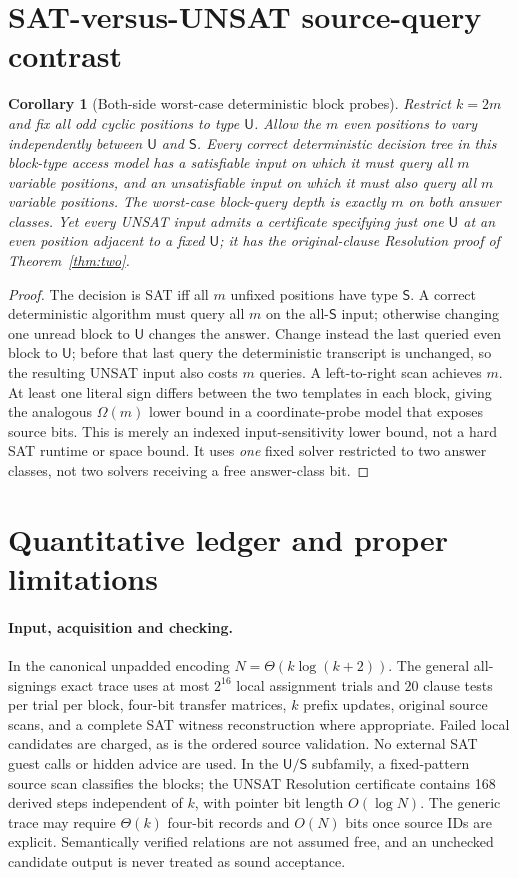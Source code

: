 \documentclass[11pt]{article}
\newtheorem{corollary}[theorem]{Corollary}
\newcommand{\U}{\mathsf{U}}
\newcommand{\V}{\mathsf{S}}
\begin{document}
\section{SAT-versus-UNSAT source-query contrast}
\begin{corollary}[Both-side worst-case deterministic block probes]\label{cor:query}
Restrict $k=2m$ and fix all odd cyclic positions to type $\U$. Allow the $m$ even positions to vary independently between $\U$ and $\V$. Every correct deterministic decision tree in this block-type access model has a satisfiable input on which it must query all $m$ variable positions, and an unsatisfiable input on which it must also query all $m$ variable positions. The worst-case block-query depth is exactly $m$ on both answer classes. Yet every UNSAT input admits a certificate specifying just one $\U$ at an even position adjacent to a fixed $\U$; it has the original-clause Resolution proof of Theorem~\ref{thm:two}.
\end{corollary}
\begin{proof}
The decision is SAT iff all $m$ unfixed positions have type $\V$. A correct deterministic algorithm must query all $m$ on the all-$\V$ input; otherwise changing one unread block to $\U$ changes the answer. Change instead the last queried even block to $\U$; before that last query the deterministic transcript is unchanged, so the resulting UNSAT input also costs $m$ queries. A left-to-right scan achieves $m$. At least one literal sign differs between the two templates in each block, giving the analogous $\Omega(m)$ lower bound in a coordinate-probe model that exposes source bits. This is merely an indexed input-sensitivity lower bound, not a hard SAT runtime or space bound. It uses \emph{one} fixed solver restricted to two answer classes, not two solvers receiving a free answer-class bit.
\end{proof}

\section{Quantitative ledger and proper limitations}
\paragraph{Input, acquisition and checking.} In the canonical unpadded encoding $N=\Theta(k\log(k+2))$. The general all-signings exact trace uses at most $2^{16}$ local assignment trials and $20$ clause tests per trial per block, four-bit transfer matrices, $k$ prefix updates, original source scans, and a complete SAT witness reconstruction where appropriate. Failed local candidates are charged, as is the ordered source validation. No external SAT guest calls or hidden advice are used. In the $\U/\V$ subfamily, a fixed-pattern source scan classifies the blocks; the UNSAT Resolution certificate contains 168 derived steps independent of $k$, with pointer bit length $O(\log N)$. The generic trace may require $\Theta(k)$ four-bit records and $O(N)$ bits once source IDs are explicit. Semantically verified relations are not assumed free, and an unchecked candidate output is never treated as sound acceptance.
\end{document}
